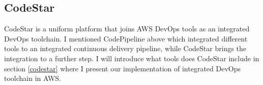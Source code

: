 \subsection{CodeStar}
CodeStar is a uniform platform that joins AWS DevOps tools as an integrated DevOps toolchain. I mentioned CodePipeline above which integrated different tools to an integrated continuous delivery pipeline, while CodeStar brings the integration to a further step.
I will introduce what tools does CodeStar include in section \ref{codestar} where I present our implementation of integrated DevOps toolchain in AWS.